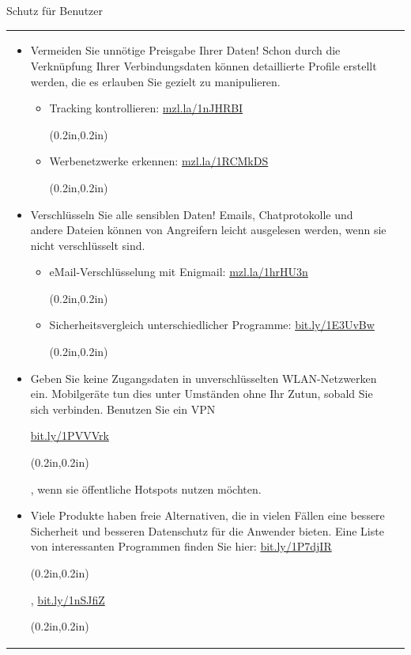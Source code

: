 \documentclass[final]{beamer}
\newcommand{\barcode}[1]{
\url{#1} \begin{pspicture}(0.2in,0.2in) 
\psbarcode[scalex=0.5,scaley=0.5]{#1}{}{qrcode} 
\end{pspicture}
}
\begin{document}
\begin{frame}[t]
\begin{columns}[b]
\begin{column}{0.95\textwidth}
\begin{alertblock}{Schutz für Benutzer}
\begin{tabular*}{20cm}{ ll }
\begin{minipage}[t]{0.45\linewidth}
\small {
\begin{itemize}

 \item Vermeiden Sie unnötige Preisgabe Ihrer Daten! Schon durch die Verknüpfung Ihrer 
 Verbindungsdaten können detaillierte Profile erstellt werden, die es erlauben Sie gezielt zu 
 manipulieren.
 \begin{itemize}
    \item Tracking kontrollieren: \barcode{mzl.la/1nJHRBI}
    \item Werbenetzwerke erkennen: \barcode{mzl.la/1RCMkDS}
 \end{itemize}

 \item Verschlüsseln Sie alle sensiblen Daten! Emails, Chatprotokolle und andere Dateien können
 von Angreifern leicht ausgelesen werden, wenn sie nicht verschlüsselt sind. 

 \begin{itemize}
    \item eMail-Verschlüsselung mit Enigmail: \barcode{mzl.la/1hrHU3n}
    \item Sicherheitsvergleich unterschiedlicher Programme: \barcode{bit.ly/1E3UvBw}
 \end{itemize}
  
 \item Geben Sie keine Zugangsdaten in unverschlüsselten WLAN-Netzwerken ein. Mobilgeräte tun
 dies unter Umständen ohne Ihr Zutun, sobald Sie sich verbinden. Benutzen Sie ein VPN 
\barcode{bit.ly/1PVVVrk}, wenn sie öffentliche Hotspots nutzen möchten.
 
 \item Viele Produkte haben freie Alternativen, die in vielen Fällen eine bessere Sicherheit
 und besseren Datenschutz für die Anwender bieten. Eine Liste von interessanten Programmen finden
 Sie hier: \barcode{bit.ly/1P7djIR}, \barcode{bit.ly/1nSJfiZ}

\end{itemize}
} %
\end{minipage}
\end{tabular*}
\end{alertblock}


\end{column}

\end{columns}

\end{frame} %
\end{document}
